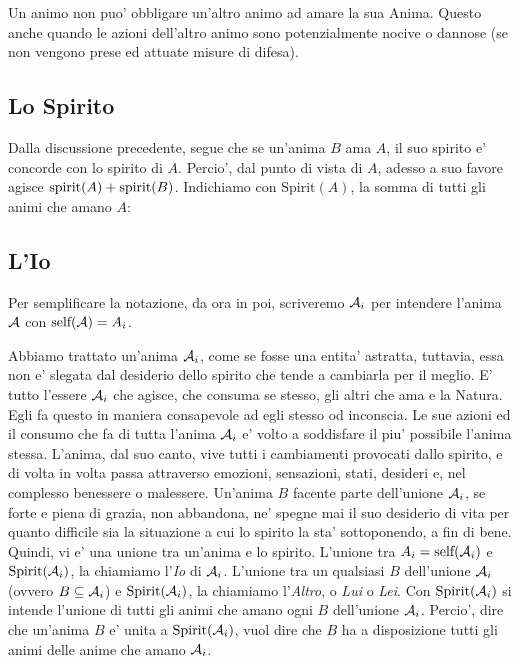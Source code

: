 Un animo non puo' obbligare un'altro animo ad amare la sua Anima. Questo anche quando le azioni dell'altro animo sono potenzialmente nocive o dannose (se non vengono prese ed attuate misure di difesa).


\def\Dio{D}

\subsection{Lo Spirito}

\def\Spirit#1{\textrm{Spirit}(#1)}

Dalla discussione precedente, segue che se un'anima $B$ ama $A$, il suo spirito e' concorde con lo spirito di $A$. Percio', dal punto di vista di $A$, adesso a suo favore agisce $\textrm{spirit}(A)+\textrm{spirit}(B)$. Indichiamo con $\Spirit{A}$, la somma di tutti gli animi che amano $A$:

\eal{&
    \Spirit{A} = \sum_{X\textrm{ anima, }X\supseteq A} \spirit{X}
}



\subsection{L'Io}

Per semplificare la notazione, da ora in poi, scriveremo $\mathcal{A}_i$ per intendere l'anima $\mathcal{A}$ con $\textrm{self}(\mathcal{A})=A_i$.

\def\Io{\textrm{Io}}

\def\esAi{\anima{A}_i}
\def\esAj{\anima{A}_j}
\def\esAE{\anima{A}_E}
\def\Io{\textrm{Io}}
\def\Altro{\textrm{Altro}}
\def\Noi{\textrm{Noi}}
\def\Tutti{\textrm{Tutti}}

Abbiamo trattato un'anima $\esAi$, come se fosse una entita' astratta, tuttavia, essa non e' slegata dal desiderio dello spirito che tende a cambiarla per il meglio. E' tutto l'essere $\esAi$ che agisce, che consuma se stesso, gli altri che ama e la Natura. Egli fa questo in maniera consapevole ad egli stesso od inconscia. Le sue azioni ed il consumo che fa di tutta l'anima $\esAi$ e' volto a soddisfare il piu' possibile l'anima stessa. L'anima, dal suo canto, vive tutti i cambiamenti provocati dallo spirito, e di volta in volta passa attraverso emozioni, sensazioni, stati, desideri e, nel complesso benessere o malessere. Un'anima $B$ facente parte dell'unione $\esAi$, se forte e piena di grazia, non abbandona, ne' spegne mai il suo desiderio di vita per quanto difficile sia la situazione a cui lo spirito la sta' sottoponendo, a fin di bene. Quindi, vi e' una unione tra un'anima e lo spirito. L'unione tra $A_i=\self(\esAi)$ e $\Spirit{\esAi}$, la chiamiamo l'\emph{Io} di $\esAi$. L'unione tra un qualsiasi $B$ dell'unione $\esAi$ (ovvero $B\subseteq\esAi$) e $\Spirit{\esAi}$, la chiamiamo l'\emph{Altro}, o \emph{Lui} o \emph{Lei}. Con $\Spirit{\esAi}$ si intende l'unione di tutti gli animi che amano ogni $B$ dell'unione $\esAi$.
Percio', dire che un'anima $B$ e' unita a $\Spirit{\esAi}$, vuol dire che $B$ ha a disposizione tutti gli animi delle anime che amano $\esAi$.

